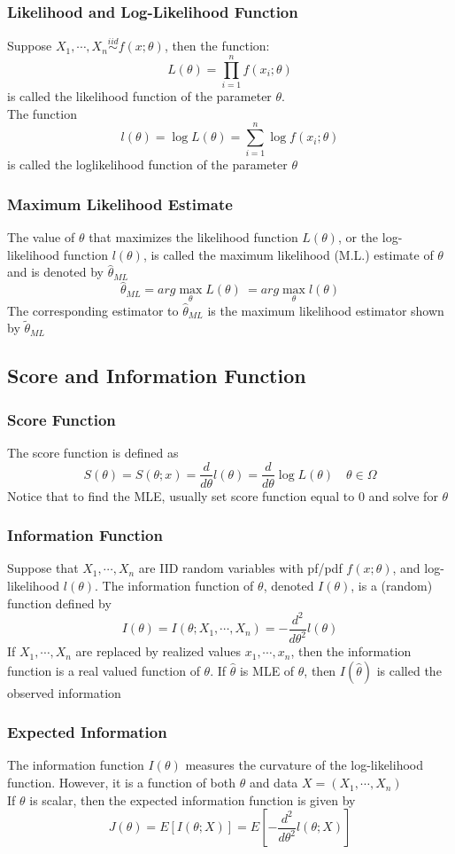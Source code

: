 \documentclass[11pt]{article}
\begin{document}
\subsubsection{Likelihood and Log-Likelihood Function}
Suppose $X_1,\cdots,X_n\overset{iid}{\sim}f(x;\theta)$, then the function:
\[L(\theta) = \prod_{i=1}^{n}f(x_i;\theta)\]
is called the likelihood function of the parameter $\theta$. \\
The function 
\[l(\theta) = \log L(\theta) = \sum_{i=1}^{n}\log f(x_i;\theta)\]
is called the loglikelihood function of the parameter $\theta$
\subsubsection{Maximum Likelihood Estimate}
The value of $\theta$ that maximizes the likelihood function $L(\theta)$, or the log-likelihood function $l(\theta)$, 
is called the maximum likelihood (M.L.) estimate of $\theta$ and is denoted by $\hat\theta_{ML}$
\[\hat\theta_{ML} = arg\max_{\theta}L(\theta)\ = arg\max_{\theta}l(\theta)\]
The corresponding estimator to $\hat\theta_{ML}$ is the maximum likelihood estimator shown by $\tilde{\theta}_{ML}$
\subsection{Score and Information Function}
\subsubsection{Score Function}
The score function is defined as 
\[S(\theta) = S(\theta;x) = \frac{d}{d\theta}l(\theta) = \frac{d}{d\theta}\log L(\theta)\quad\theta\in\Omega\]
Notice that to find the MLE, usually set score function equal to 0 and solve for $\theta$
\subsubsection{Information Function}
Suppose that $X_1,\cdots,X_n$ are IID random variables with pf/pdf $f(x;\theta)$, and log-likelihood $l(\theta)$.
The information function of $\theta$, denoted $I(\theta)$, is a (random) function defined by 
\[I(\theta) = I(\theta;X_1,\cdots,X_n)=-\frac{d^2}{d\theta^2}l(\theta)\] 
If $X_1,\cdots,X_n$ are replaced by realized values $x_1,\cdots,x_n$, then the information function is a 
real valued function of $\theta$. If $\hat\theta$ is MLE of $\theta$, then $I(\hat\theta)$ is called the observed information 
\subsubsection{Expected Information}
The information function $I(\theta)$ measures the curvature of the log-likelihood function. However, it is a function of both $\theta$ and data $X=(X_1,\cdots,X_n)$ \\
If $\theta$ is scalar, then the expected information function is given by 
\[J(\theta) = E[I(\theta;X)] = E[-\frac{d^2}{d\theta^2}l(\theta;X)]\]
\end{document}
